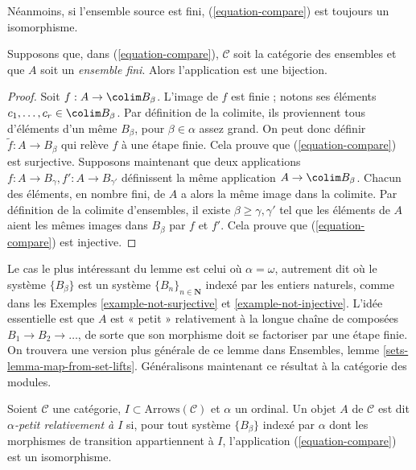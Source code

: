 \noindent
Néanmoins, si l'ensemble source est fini, (\ref{equation-compare}) est toujours
un isomorphisme.

\begin{lemma}
\label{lemma-out-of-finite}
Supposons que, dans (\ref{equation-compare}), $\mathcal{C}$ soit la catégorie
des ensembles et que $A$ soit un {\it ensemble fini}. Alors l'application est
une bijection.
\end{lemma}

\begin{proof}
Soit $f : A \to \colim B_\beta$. L'image de $f$ est finie ; notons ses éléments
$c_1, \ldots, c_r \in \colim B_\beta$. Par définition de la colimite, ils
proviennent tous d'éléments d'un même $B_\beta$, pour $\beta \in \alpha$
assez grand. On peut donc définir $\widetilde{f} : A \to B_\beta$ qui relève
$f$ à une étape finie. Cela prouve que (\ref{equation-compare}) est surjective.
Supposons maintenant que deux applications
$f : A \to B_\gamma, f' : A \to B_{\gamma'}$ définissent la même application
$A \to \colim B_\beta$. Chacun des éléments, en nombre fini, de $A$ a alors
la même image dans la colimite. Par définition de la colimite d'ensembles, il
existe $\beta \geq \gamma, \gamma'$ tel que les éléments de $A$ aient les mêmes images
dans $B_\beta$ par $f$ et $f'$. Cela prouve que (\ref{equation-compare}) est
injective.
\end{proof}

\noindent
Le cas le plus intéressant du lemme est celui où $\alpha = \omega$, autrement
dit où le système $\{B_\beta\}$ est un système
$\{B_n\}_{n \in \mathbf{N}}$ indexé par les entiers naturels, comme dans les
Exemples \ref{example-not-surjective} et \ref{example-not-injective}.
L'idée essentielle est que $A$ est « petit » relativement à la longue chaîne
de composées $B_1 \to B_2 \to \ldots$, de sorte que son morphisme doit se
factoriser par une étape finie. On trouvera une version plus générale de ce
lemme dans Ensembles, lemme \ref{sets-lemma-map-from-set-lifts}. Généralisons
maintenant ce résultat à la catégorie des modules.

\begin{definition}
\label{definition-small}
Soient $\mathcal{C}$ une catégorie, $I \subset \text{Arrows}(\mathcal{C})$
et $\alpha$ un ordinal. Un objet $A$ de $\mathcal{C}$ est dit
{\it $\alpha$-petit relativement à $I$} si, pour tout système
$\{B_\beta\}$ indexé par $\alpha$ dont les morphismes de transition
appartiennent à $I$, l'application (\ref{equation-compare}) est un
isomorphisme.
\end{definition}

